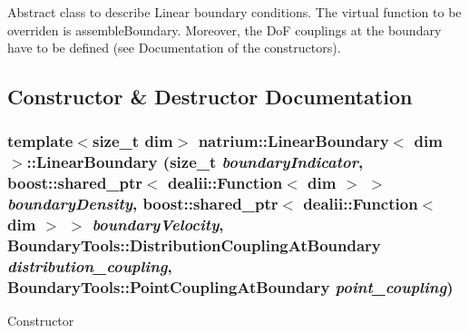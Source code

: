 Abstract class to describe Linear boundary conditions. The virtual function to be overriden is assembleBoundary. Moreover, the DoF couplings at the boundary have to be defined (see Documentation of the constructors). 

\subsection{Constructor \& Destructor Documentation}
\hypertarget{classnatrium_1_1LinearBoundary_a2f11c187ef26ee7e3f6a13ad94876a4e}{
\subsubsection[{LinearBoundary}]{\setlength{\rightskip}{0pt plus 5cm}template$<$size\_\-t dim$>$ {\bf natrium::LinearBoundary}$<$ dim $>$::{\bf LinearBoundary} (size\_\-t {\em boundaryIndicator}, \/  boost::shared\_\-ptr$<$ dealii::Function$<$ dim $>$ $>$ {\em boundaryDensity}, \/  boost::shared\_\-ptr$<$ dealii::Function$<$ dim $>$ $>$ {\em boundaryVelocity}, \/  BoundaryTools::DistributionCouplingAtBoundary {\em distribution\_\-coupling}, \/  BoundaryTools::PointCouplingAtBoundary {\em point\_\-coupling})}}
\label{classnatrium_1_1LinearBoundary_a2f11c187ef26ee7e3f6a13ad94876a4e}
Constructor 
